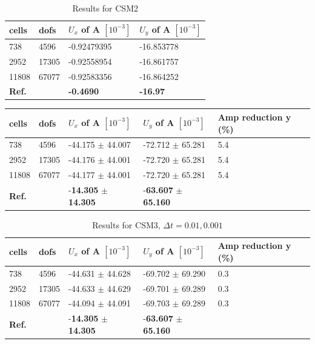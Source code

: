 \begin{table}[!h]
\begin{center}
  \begin{tabular}{|l | l | l | l|} \hline
	cells & dofs & $U_x$ of A $[10^{-3}]$ & $U_y$ of A $[10^{-3}]$\\ \hline
   738  & 4596  & -0.92479395 & -16.853778 \\   \hline
   2952 & 17305 & -0.92558954 & -16.861757 \\ \hline
   11808 & 67077 & -0.92583356 & -16.864252   \\ \hline \hline
    \textbf{Ref.}  & & \textbf{-0.4690} & \textbf{-16.97} \\ \hline 
    \hline
  \end{tabular}
\end{center}
\caption{Results for CSM2}
\end{table}

\begin{table}[!h]
\begin{center}
  \begin{tabular}{|l | l | l | l| l|} \hline
	cells & dofs & $U_x$ of A $[10^{-3}]$ & $U_y$ of A $[10^{-3}]$ & Amp reduction y (\%) \\ \hline
    738  & 4596 & -44.175 $\pm$ 44.007 & -72.712 $\pm$ 65.281 & 5.4  \\   \hline
    2952 & 17305 & -44.176 $\pm$ 44.001 & -72.720 $\pm$ 65.281 & 5.4 \\ \hline
    11808 & 67077 & -44.177 $\pm$ 44.001 & -72.720 $\pm$ 65.281 & 5.4  \\ \hline \hline
    \textbf{Ref.}  & & -\textbf{14.305} $\pm$ \textbf{14.305} & -\textbf{63.607} $\pm$ \textbf{65.160} \\ \hline 
    \hline
  \end{tabular}
\end{center}
\end{table}


\begin{table}[!h]
\begin{center}
  \begin{tabular}{|l | l | l | l| l|} \hline
	cells & dofs & $U_x$ of A $[10^{-3}]$ & $U_y$ of A $[10^{-3}]$ & Amp reduction y (\%) \\ \hline
    738  & 4596 & -44.631 $\pm$ 44.628 & -69.702 $\pm$ 69.290 & 0.3  \\   \hline
    2952 & 17305& -44.633 $\pm$ 44.629 & -69.701 $\pm$ 69.289 & 0.3 \\ \hline
    11808 & 67077& -44.094 $\pm$ 44.091 & -69.703 $\pm$ 69.289 & 0.3  \\ \hline \hline
    \textbf{Ref.}  & & -\textbf{14.305} $\pm$ \textbf{14.305} & -\textbf{63.607} $\pm$ \textbf{65.160} \\ \hline 
    \hline
  \end{tabular}
\end{center}
\caption{Results for CSM3, $\Delta t= 0.01, 0.001$}
\end{table}


